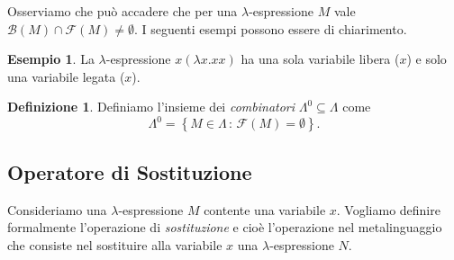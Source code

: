 \documentclass[a4paper,11pt]{article}
\theoremstyle{definition}
\newtheorem{defn}{Definizione}
\newtheorem{esempio}{Esempio}
\newcommand{\FF}{\mathcal{F}}
\newcommand{\BB}{\mathcal{B}}
\begin{document}
Osserviamo che può accadere che per una $\lambda$-espressione $M$ vale
$\BB(M)\cap\FF(M)\ne\emptyset$. I seguenti esempi possono essere di
chiarimento.

\begin{esempio}
  La $\lambda$-espressione $x(\lambda x.xx)$ ha una sola variabile libera
  ($x$) e solo una variabile legata ($x$).
\end{esempio}

\begin{defn}
  Definiamo l'insieme dei \textit{combinatori} $\Lambda^0\subseteq\Lambda$ come 
  \begin{equation}
    \Lambda^0 =\left\{ M\in\Lambda\,:\, \FF(M)=\emptyset \right\}.
  \end{equation}
\end{defn}

\subsection{Operatore di Sostituzione}
Consideriamo una $\lambda$-espressione $M$ contente una variabile $x$.
Vogliamo definire formalmente l'operazione di \textit{sostituzione} e cioè l'operazione 
nel metalinguaggio che consiste nel sostituire alla variabile $x$ 
una $\lambda$-espressione $N$.
\end{document}
